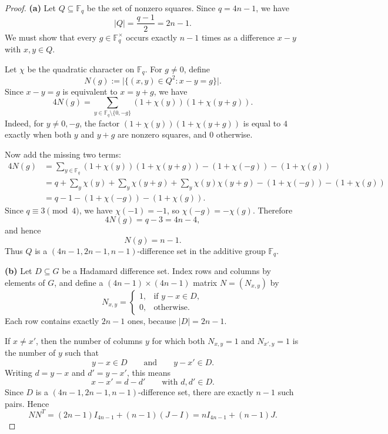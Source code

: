 \documentclass[11pt, a4paper]{ctexrep}
\begin{document}
\begin{proof}
    \noindent\textbf{(a)}
    Let \(Q\subseteq \mathbb{F}_q\) be the set of nonzero squares. Since \(q=4n-1\), we have
    \[
        |Q|=\frac{q-1}{2}=2n-1.
    \]
    We must show that every \(g\in \mathbb{F}_q^\times\) occurs exactly \(n-1\) times as a difference
    \(x-y\) with \(x,y\in Q\).

    Let \(\chi\) be the quadratic character on \(\mathbb{F}_q\). For \(g\ne 0\), define
    \[
        N(g):=\bigl|\{(x,y)\in Q^2:x-y=g\}\bigr|.
    \]
    Since \(x-y=g\) is equivalent to \(x=y+g\), we have
    \[
        4N(g)
        =
        \sum_{y\in \mathbb{F}_q\setminus\{0,-g\}}
        (1+\chi(y))(1+\chi(y+g)).
    \]
    Indeed, for \(y\ne 0,-g\), the factor \((1+\chi(y))(1+\chi(y+g))\) is equal to \(4\) exactly when both
    \(y\) and \(y+g\) are nonzero squares, and \(0\) otherwise.

    Now add the missing two terms:
    \[
        \begin{aligned}
            4N(g)
             & =
            \sum_{y\in \mathbb{F}_q}(1+\chi(y))(1+\chi(y+g))
            -(1+\chi(-g))-(1+\chi(g)) \\
             & =
            q+\sum_{y}\chi(y)+\sum_{y}\chi(y+g)+\sum_{y}\chi(y)\chi(y+g)
            -(1+\chi(-g))-(1+\chi(g)) \\
             & =
            q-1-(1+\chi(-g))-(1+\chi(g)).
        \end{aligned}
    \]
    Since \(q\equiv 3\pmod 4\), we have \(\chi(-1)=-1\), so \(\chi(-g)=-\chi(g)\). Therefore
    \[
        4N(g)=q-3=4n-4,
    \]
    and hence
    \[
        N(g)=n-1.
    \]
    Thus \(Q\) is a \((4n-1,2n-1,n-1)\)-difference set in the additive group \(\mathbb{F}_q\).

    \noindent\textbf{(b)}
    Let \(D\subseteq G\) be a Hadamard difference set. Index rows and columns by elements of \(G\), and define
    a \((4n-1)\times(4n-1)\) matrix \(N=(N_{x,y})\) by
    \[
        N_{x,y}=
        \begin{cases}
            1, & \text{if } y-x\in D, \\
            0, & \text{otherwise.}
        \end{cases}
    \]
    Each row contains exactly \(2n-1\) ones, because \(|D|=2n-1\).

    If \(x\ne x'\), then the number of columns \(y\) for which both \(N_{x,y}=1\) and \(N_{x',y}=1\) is the
    number of \(y\) such that
    \[
        y-x\in D
        \qquad\text{and}\qquad
        y-x'\in D.
    \]
    Writing \(d=y-x\) and \(d'=y-x'\), this means
    \[
        x-x'=d-d'
        \qquad\text{with } d,d'\in D.
    \]
    Since \(D\) is a \((4n-1,2n-1,n-1)\)-difference set, there are exactly \(n-1\) such pairs. Hence
    \[
        NN^T = (2n-1)I_{4n-1}+(n-1)(J-I)=nI_{4n-1}+(n-1)J.
    \]


\end{proof}
\end{document}
